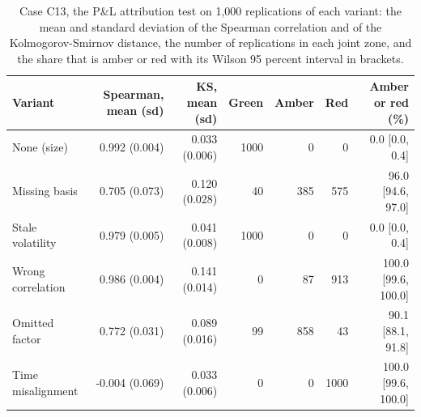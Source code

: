 \begin{table}[htbp]
\centering
\scriptsize
\setlength{\tabcolsep}{2.0pt}
\caption{Case C13, the P\&L attribution test on 1,000 replications of each variant: the mean and standard deviation of the Spearman correlation and of the Kolmogorov-Smirnov distance, the number of replications in each joint zone, and the share that is amber or red with its Wilson 95 percent interval in brackets.}
\label{tab:market-pla}
\begin{tabular}{lrrrrrr}
\toprule
Variant & Spearman, mean (sd) & KS, mean (sd) & Green & Amber & Red & Amber or red (\%) \\
\midrule
None (size) & 0.992 (0.004) & 0.033 (0.006) & 1000 & 0 & 0 & 0.0 [0.0, 0.4] \\
Missing basis & 0.705 (0.073) & 0.120 (0.028) & 40 & 385 & 575 & 96.0 [94.6, 97.0] \\
Stale volatility & 0.979 (0.005) & 0.041 (0.008) & 1000 & 0 & 0 & 0.0 [0.0, 0.4] \\
Wrong correlation & 0.986 (0.004) & 0.141 (0.014) & 0 & 87 & 913 & 100.0 [99.6, 100.0] \\
Omitted factor & 0.772 (0.031) & 0.089 (0.016) & 99 & 858 & 43 & 90.1 [88.1, 91.8] \\
Time misalignment & -0.004 (0.069) & 0.033 (0.006) & 0 & 0 & 1000 & 100.0 [99.6, 100.0] \\
\bottomrule
\end{tabular}
\end{table}
